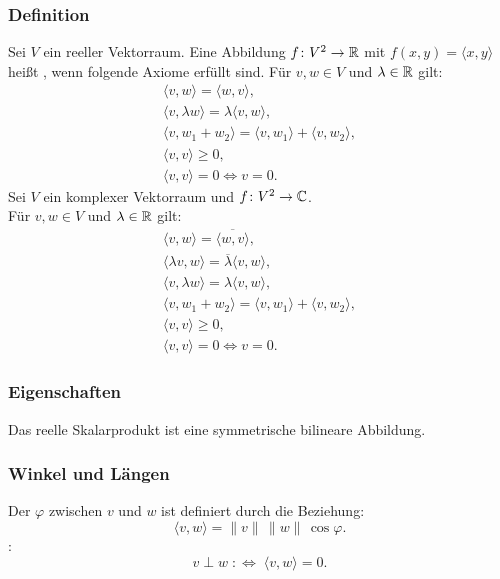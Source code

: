 \subsubsection{Definition}
Sei $V$ ein reeller Vektorraum. Eine Abbildung $f\colon V^2\to\mathbb R$
mit $f(x,y)=\langle x,y\rangle$ heißt , wenn
folgende Axiome erfüllt sind. Für $v,w\in V$ und $\lambda\in\mathbb R$ gilt:
\begin{gather}
\langle v,w\rangle = \langle w,v\rangle,\\
\langle v,\lambda w\rangle = \lambda\langle v,w\rangle,\\
\langle v,w_1+w_2\rangle = \langle v,w_1\rangle +\langle v,w_2\rangle,\\
\langle v,v\rangle\ge 0,\\
\langle v,v\rangle=0 \iff v=0.
\end{gather}
Sei $V$ ein komplexer Vektorraum und $f\colon V^2\to\mathbb C$.\\
Für $v,w\in V$ und $\lambda\in\mathbb R$ gilt:
\begin{gather}
\langle v,w\rangle = \overline{\langle w,v\rangle},\\
\langle \lambda v,w\rangle = \overline{\lambda}\langle v,w\rangle,\\
\langle v,\lambda w\rangle = \lambda\langle v,w\rangle,\\
\langle v,w_1+w_2\rangle = \langle v,w_1\rangle +\langle v,w_2\rangle,\\
\langle v,v\rangle\ge 0,\\
\langle v,v\rangle=0 \iff v=0.
\end{gather}

\subsubsection{Eigenschaften}
Das reelle Skalarprodukt ist eine symmetrische bilineare Abbildung.

\subsubsection{Winkel und Längen}
\begin{definition}
Der  $\varphi$ zwischen $v$ und $w$
ist definiert durch die Beziehung:
\begin{equation}
\langle v,w\rangle = \|v\|\,\|w\|\,\cos\varphi.
\end{equation}
:
\begin{equation}
v\perp w \;:\Longleftrightarrow\; \langle v,w\rangle=0.
\end{equation}
\end{definition}

